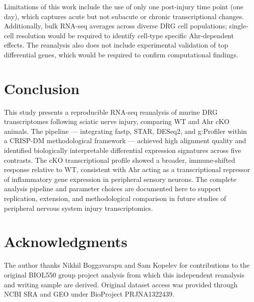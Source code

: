 \documentclass[conference]{IEEEtran}
\begin{document}
Limitations of this work include the use of only one post-injury time point (one day), which captures acute but not subacute or chronic transcriptional changes. Additionally, bulk RNA-seq averages across diverse DRG cell populations; single-cell resolution would be required to identify cell-type specific Ahr-dependent effects. The reanalysis also does not include experimental validation of top differential genes, which would be required to confirm computational findings.

\section{Conclusion}

This study presents a reproducible RNA-seq reanalysis of murine DRG transcriptomes following sciatic nerve injury, comparing WT and Ahr cKO animals. The pipeline — integrating fastp, STAR, DESeq2, and g:Profiler within a CRISP-DM methodological framework — achieved high alignment quality and identified biologically interpretable differential expression signatures across five contrasts. The cKO transcriptional profile showed a broader, immune-shifted response relative to WT, consistent with Ahr acting as a transcriptional repressor of inflammatory gene expression in peripheral sensory neurons. The complete analysis pipeline and parameter choices are documented here to support replication, extension, and methodological comparison in future studies of peripheral nervous system injury transcriptomics.

\section*{Acknowledgments}

The author thanks Nikhil Boggavarapu and Sam Kopelev for contributions to the original BIOL550 group project analysis from which this independent reanalysis and writing sample are derived. Original dataset access was provided through NCBI SRA and GEO under BioProject PRJNA1322439.
\end{document}
